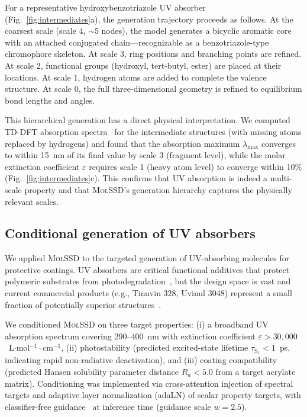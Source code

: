 \documentclass[11pt]{article}
\newcommand{\molssd}{\textsc{MolSSD}}
\begin{document}
For a representative hydroxybenzotriazole UV absorber (Fig.~\ref{fig:intermediates}a), the generation trajectory proceeds as follows. At the coarsest scale (scale 4, $\sim$5 nodes), the model generates a bicyclic aromatic core with an attached conjugated chain---recognizable as a benzotriazole-type chromophore skeleton. At scale 3, ring positions and branching points are refined. At scale 2, functional groups (hydroxyl, tert-butyl, ester) are placed at their locations. At scale 1, hydrogen atoms are added to complete the valence structure. At scale 0, the full three-dimensional geometry is refined to equilibrium bond lengths and angles.

This hierarchical generation has a direct physical interpretation. We computed TD-DFT absorption spectra~\cite{casida1995tddft} for the intermediate structures (with missing atoms replaced by hydrogens) and found that the absorption maximum $\lambda_{\max}$ converges to within 15~nm of its final value by scale 3 (fragment level), while the molar extinction coefficient $\varepsilon$ requires scale 1 (heavy atom level) to converge within 10\% (Fig.~\ref{fig:intermediates}c). This confirms that UV absorption is indeed a multi-scale property and that \molssd{}'s generation hierarchy captures the physically relevant scales.


\subsection*{Conditional generation of UV absorbers}

We applied \molssd{} to the targeted generation of UV-absorbing molecules for protective coatings. UV absorbers are critical functional additives that protect polymeric substrates from photodegradation~\cite{gugumus1995stabilization, yousif2013photodegradation}, but the design space is vast and current commercial products (e.g., Tinuvin 328, Uvinul 3048) represent a small fraction of potentially superior structures~\cite{schaller2009uv, bojinov2012photostabilizers}.

We conditioned \molssd{} on three target properties: (i) a broadband UV absorption spectrum covering 290--400~nm with extinction coefficient $\varepsilon > 30{,}000$~L$\cdot$mol$^{-1}\cdot$cm$^{-1}$, (ii) photostability (predicted excited-state lifetime $\tau_{\text{S}_1} < 1$~ps, indicating rapid non-radiative deactivation), and (iii) coating compatibility (predicted Hansen solubility parameter distance $R_a < 5.0$ from a target acrylate matrix). Conditioning was implemented via cross-attention injection of spectral targets and adaptive layer normalization (adaLN) of scalar property targets, with classifier-free guidance~\cite{ho2022classifierfree} at inference time (guidance scale $w = 2.5$).
\end{document}
